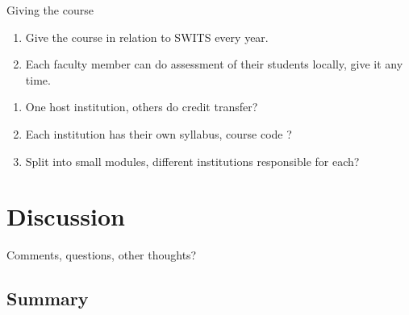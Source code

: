 \begin{frame}
  \begin{block}{Giving the course}
    \begin{enumerate}
      \item Give the course in relation to SWITS every year.
      \item Each faculty member can do assessment of their students locally, 
        \ie give it any time.
    \end{enumerate}
  \end{block}

  \pause

  \begin{remark}[Administration]
    \begin{enumerate}
      \item One host institution, others do credit transfer?
      \item Each institution has their own syllabus, course code \etc?
      \item Split into small modules, different institutions responsible for 
        each?
    \end{enumerate}
  \end{remark}
\end{frame}


\section{Discussion}

\begin{frame}
  \begin{center}
    Comments, questions, other thoughts?
  \end{center}
\end{frame}


\subsection{Summary}

